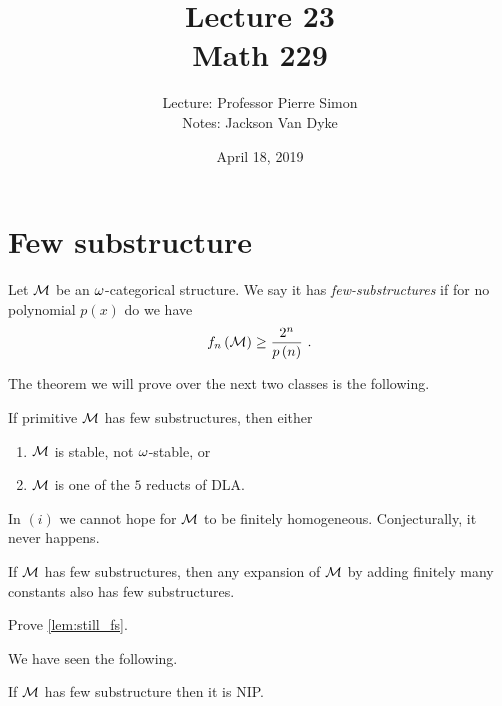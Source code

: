 \documentclass{amsart}
\begin{document}
\title{Lecture 23\\ Math 229}
\author{Lecture: Professor Pierre Simon\\ Notes: Jackson Van Dyke}
\date{April 18, 2019}
\maketitle

\section{Few substructure}

\begin{defn}
Let $\mathcal{M}$ be an $\omega$-categorical structure. We say it has \emph{few-substructures} if for
no polynomial $p\left(x\right)$ do we have
\begin{equation}
f_n\left(\mathcal{M}\right) \geq \frac{2^n}{p\left(n\right)} \ .
\end{equation}
\end{defn}

The theorem we will prove over the next two classes is the following.

\begin{thm}
If primitive $\mathcal{M}$ has few substructures, then either
\begin{enumerate}[label = (\iii)]
\item $\mathcal{M}$ is stable, not $\omega$-stable, or
\item $\mathcal{M}$ is one of the $5$ reducts of DLA.
\end{enumerate}
\end{thm}

\begin{rmk}
In $\left(i\right)$ we cannot hope for $\mathcal{M}$ to be finitely homogeneous.
Conjecturally, it never happens.
\end{rmk}

\begin{lem}
If $\mathcal{M}$ has few substructures, then any expansion of $\mathcal{M}$ by adding finitely many constants
also has few substructures.
\label{lem:still_fs}
\end{lem}

\begin{exr}
Prove \cref{lem:still_fs}.
\end{exr}

We have seen the following.

\begin{fact}
If $\mathcal{M}$ has few substructure then it is NIP.
\end{fact}
\end{document}
